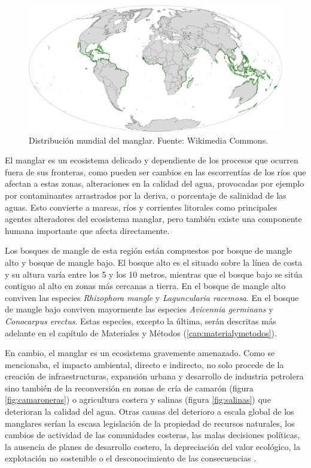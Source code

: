 \begin{figure}
	\centering
	\includegraphics[width=0.8\linewidth]{./Imagenes/distribucion_mundial_mangle.eps}
	\caption[Distribución mundial de manglar]{Distribución mundial del manglar. Fuente: Wikimedia Commons.}
	\label{fig:mundial}
\end{figure}

El manglar es un ecosistema delicado y dependiente de los procesos que ocurren fuera de sus fronteras, como pueden ser cambios en las escorrentías de los ríos que afectan a estas zonas, alteraciones en la calidad del agua, provocadas por ejemplo por contaminantes arrastrados por la deriva, o porcentaje de salinidad de las aguas. Esto convierte a mareas, ríos y corrientes litorales como principales agentes alteradores del ecosistema manglar, pero también existe una componente humana importante que afecta directamente.\Sep

Los bosques de mangle de esta región están compuestos por bosque de mangle alto y bosque de mangle bajo. El bosque alto es el situado sobre la línea de costa y su altura varía entre los 5 y los 10 metros, mientras que el bosque bajo se sitúa contiguo al alto en zonas más cercanas a tierra. En el bosque de mangle alto conviven las especies \textit{Rhizophora mangle} y \textit{Laguncularia racemosa}. En el bosque de mangle bajo conviven mayormente las especies \textit{Avicennia germinans} y \textit{Conocarpus erectus}. Estas especies, excepto la última, serán descritas más adelante en el capítulo de Materiales y Métodos (\ref{cap:materialymetodos}).\Sep

En cambio, el manglar es un ecosistema gravemente amenazado. Como se mencionaba, el impacto ambiental, directo e indirecto, no solo procede de la creación de infraestructuras, expansión urbana y desarrollo de industria petrolera sino también de la reconversión en zonas de cría de camarón (figura \ref{fig:camaroneras}) o agricultura costera y salinas (figura \ref{fig:salinas}) que deterioran la calidad del agua. Otras causas del deterioro a escala global de los manglares serían la escasa legislación de la propiedad de recursos naturales, los cambios de actividad de las comunidades costeras, las malas decisiones políticas, la ausencia de planes de desarrollo costero, la depreciación del valor ecológico, la explotación no sostenible o el desconocimiento de las consecuencias \citep{yanez1994}.\Sep

